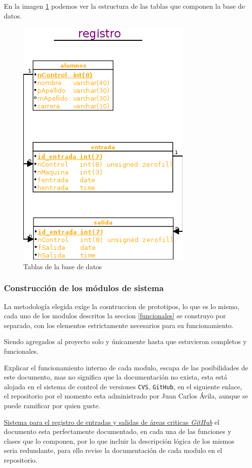 \documentclass[12pt]{article} %
\begin{document}
		En la imagen \ref{db_reg} podemos ver la estructura de las tablas que componen la base de datos.
		\begin{figure}[h!]%
			\centering
			\includegraphics[scale=0.5]{./imagenes/db_registro}
			\caption{Tablas de la base de datos}\label{db_reg}
		\end{figure}
	\subsubsection[Modulos]{Construcci\'on de los m\'odulos de sistema}
		La metodología elegida exige la cosntruccion de prototipos, lo que es lo mismo, cada uno de los modulos descritos la seccion \ref{funcionales} se construyo por separado,
		con los elementos estrictamente necesarios para su funcionamiento.
		
		Siendo agregados al proyecto solo y únicamente hasta que estuvieron completos y funcionales.
		
		Explicar el funcionamiento interno de cada modulo, escapa de las posibilidades de este documento, mas no significa que la documentación no exista, esta est\'a alojada
		en el sistema de control de versiones \texttt{CVS}, \texttt{GitHub}, en el siguiente enlace, el repositorio por el momento esta administrado por 
		\textsf{Juan Carlos \'Avila}, aunque se puede ramificar por quien guste.
		
		\href{http://github.com/karlislee/sistema-de-control}{Sistema para el registro de entradas y salidas de áreas criticas \textsl{GitHub}}
		el documento esta perfectamente documentado, en cada una de las funciones y clases que lo componen, por lo que incluir la descripción lógica de los mismos seria 
		redundante, para ello revise la documentación de cada modulo en el repositorio.
		
\end{document}
